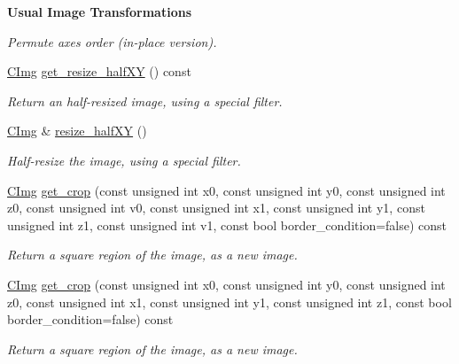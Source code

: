 \begin{Indent}{\bf Usual Image Transformations}
\begin{DoxyCompactItemize}
\begin{DoxyCompactList}\small\item\em Permute axes order (in-\/place version). \item\end{DoxyCompactList}\item 
\hyperlink{structcimg__library_1_1_c_img}{CImg} \hyperlink{structcimg__library_1_1_c_img_ad8a8546f8ec3a38d580e212797841c49}{get\_\-resize\_\-halfXY} () const 
\begin{DoxyCompactList}\small\item\em Return an half-\/resized image, using a special filter. \item\end{DoxyCompactList}\item 
\hyperlink{structcimg__library_1_1_c_img}{CImg} \& \hyperlink{structcimg__library_1_1_c_img_a593ac7955800c9964972eac146835227}{resize\_\-halfXY} ()
\begin{DoxyCompactList}\small\item\em Half-\/resize the image, using a special filter. \item\end{DoxyCompactList}\item 
\hyperlink{structcimg__library_1_1_c_img}{CImg} \hyperlink{structcimg__library_1_1_c_img_a9adfb440e85e8f92eb6bbd17bdca0236}{get\_\-crop} (const unsigned int x0, const unsigned int y0, const unsigned int z0, const unsigned int v0, const unsigned int x1, const unsigned int y1, const unsigned int z1, const unsigned int v1, const bool border\_\-condition=false) const 
\begin{DoxyCompactList}\small\item\em Return a square region of the image, as a new image. \item\end{DoxyCompactList}\item 
\hyperlink{structcimg__library_1_1_c_img}{CImg} \hyperlink{structcimg__library_1_1_c_img_a21d83462899c158d09206c8d89554386}{get\_\-crop} (const unsigned int x0, const unsigned int y0, const unsigned int z0, const unsigned int x1, const unsigned int y1, const unsigned int z1, const bool border\_\-condition=false) const 
\begin{DoxyCompactList}\small\item\em Return a square region of the image, as a new image. \item\end{DoxyCompactList}\item 

\end{DoxyCompactItemize}
\end{Indent}
